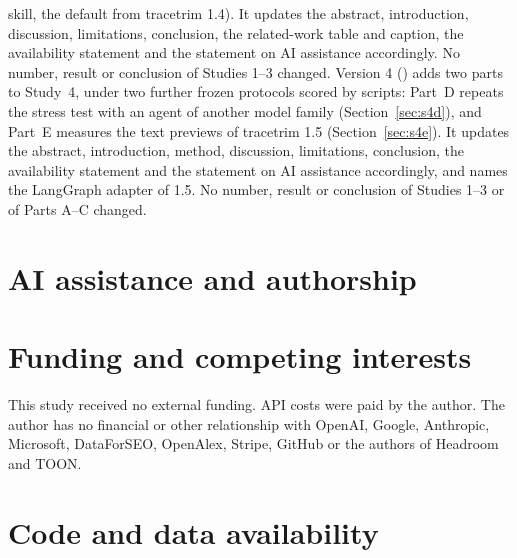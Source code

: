 \documentclass[11pt]{article}
\begin{document}
skill, the default from tracetrim 1.4). It updates the abstract, introduction, discussion, limitations, conclusion,
the related-work table and caption, the availability statement and the statement on AI assistance accordingly. No number, result or conclusion of Studies 1--3 changed.
Version 4 (\PaperVersionFourDate) adds two parts to Study~4, under two further frozen protocols scored by scripts:
Part~D repeats the stress test with an agent of another model family (Section~\ref{sec:s4d}), and Part~E measures
the text previews of tracetrim 1.5 (Section~\ref{sec:s4e}). It updates the abstract, introduction, method,
discussion, limitations, conclusion, the availability statement and the statement on AI assistance accordingly, and names the LangGraph
adapter of 1.5. No number, result or conclusion of Studies 1--3 or of Parts A--C changed.

\section*{AI assistance and authorship}


\section*{Funding and competing interests}
This study received no external funding. API costs were paid by the author. The author has no financial or other
relationship with OpenAI, Google, Anthropic, Microsoft, DataForSEO, OpenAlex, Stripe, GitHub or the authors of
Headroom and TOON.

\section*{Code and data availability}





\appendix


\end{document}
